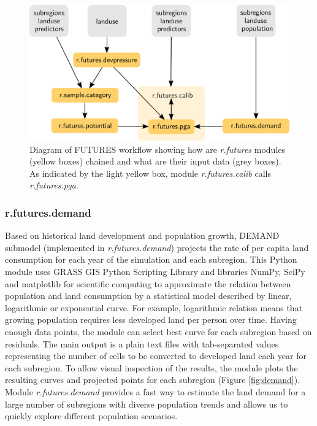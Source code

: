\documentclass{isprs}
\begin{document}
\begin{figure}[h!]
 \centering
 \includegraphics[width=\columnwidth]{./figures/grass_futures_diagram.png}
 \caption{Diagram of FUTURES workflow showing how are \emph{r.futures} modules (yellow boxes) chained 
 and what are their input data (grey boxes). As indicated by the light yellow box,
 module \emph{r.futures.calib} calls \emph{r.futures.pga}.}
 \label{fig:schemaGRASS}
\end{figure}


\subsubsection{r.futures.demand}
Based on historical land development and population growth, DEMAND submodel 
(implemented in \emph{r.futures.demand})
projects the rate of per capita land consumption for each year of the simulation
and each subregion. This Python module uses GRASS GIS Python Scripting
Library and libraries NumPy, SciPy and matplotlib for scientific computing
to approximate the relation between population and land consumption
by a statistical model described by linear, logarithmic or exponential curve.
For example, logarithmic relation means that growing population requires
less developed land per person over time.
Having enough data points, the module
can select best curve for each subregion based on residuals.
The main output is a plain text files with tab-separated values
representing the number of cells to be converted to developed land each year for each subregion.
To allow visual inspection of the results, the module
plots the resulting curves and projected points for each subregion (Figure \ref{fig:demand}).
Module \emph{r.futures.demand} provides a fast way to estimate
the land demand for a large number of subregions with diverse population
trends and allows us to quickly explore different population scenarios.
\end{document}
